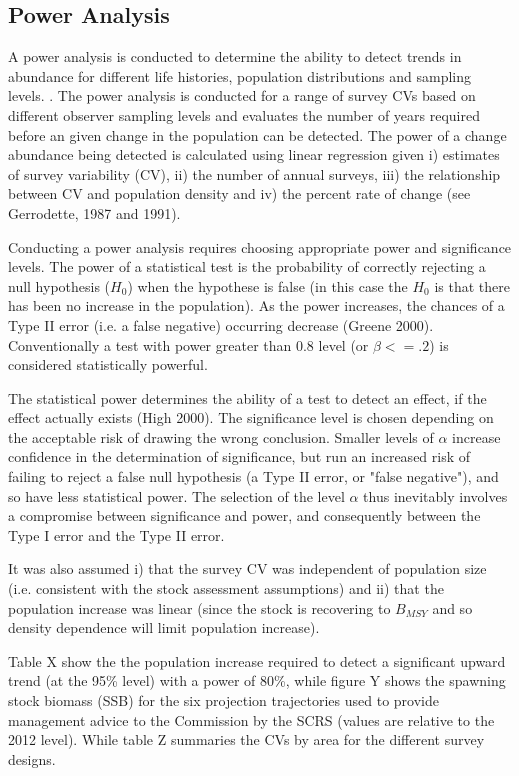 \documentclass[preprint,authoryear,12pt]{elsarticle}
\begin{document}
\subsection{Power Analysis}
A power analysis is conducted to determine the ability to detect trends in abundance for different life histories, population distributions
and sampling levels.
.
The power analysis is conducted for a range of survey CVs based on different observer sampling levels and evaluates the number of years 
required before an given change in the population can be detected. The power of a change abundance being detected is 
calculated using linear regression given i) estimates of survey variability (CV), ii) the number of annual surveys, iii) 
the relationship between CV and population density and iv) the percent rate of change (see Gerrodette, 1987 and 1991).
 
Conducting a power analysis requires choosing appropriate power and significance levels. The power of a statistical test is 
the probability of correctly rejecting a null hypothesis ($H_0$) when the hypothese is false (in this case the $H_0$ is that 
there has been no increase in the population).  As the power increases, the chances of a Type II error (i.e. a false negative) 
occurring decrease (Greene 2000). Conventionally a test with power greater than 0.8 level (or $\beta<=.2$) is considered statistically 
powerful.

The statistical power determines the ability of a test to detect an effect, if the effect actually exists (High 2000). The significance level is chosen depending on the acceptable risk of drawing the wrong conclusion. Smaller levels of $\alpha$ increase confidence in the determination of significance, but run an increased risk of failing to reject a false null hypothesis (a Type II error, or "false negative"), and so have less statistical power. The selection of the level $\alpha$ thus inevitably involves a compromise between significance and power, and consequently between the Type I error and the Type II error.

It was also assumed i) that the survey CV was independent of population size (i.e. consistent with the stock assessment assumptions) and ii) that the population increase was linear (since the stock is recovering to $B_{MSY}$ and so density dependence will limit population increase). 

Table X show the the population increase required to detect a significant upward trend (at the 95\% level) with a power of 80\%, while figure Y shows the spawning stock biomass (SSB) for the six projection trajectories used to provide management advice to the Commission by the SCRS (values are relative to the 2012 level). While table Z summaries the CVs by area for the different survey designs.
\end{document}
